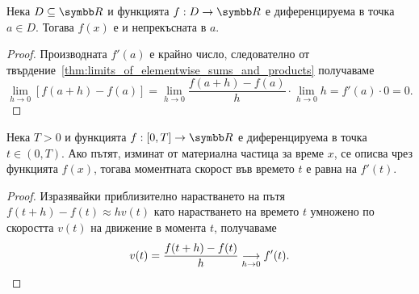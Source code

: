 \documentclass[numbers=endperiod, bibliography=totocnumbered]{scrartcl}
\begin{document}
\begin{proposition}
  Нека \( D \subseteq \R \) и функцията \( f: D \to \R \) е диференцируема в точка \( a \in D \). Тогава \( f(x) \) е и непрекъсната в \( a \).
\end{proposition}
\begin{proof}
  Производната \( f'(a) \) е крайно число, следователно от твърдение~\ref{thm:limits_of_elementwise_sums_and_products} получаваме
  \begin{equation*}
    \lim_{h \to 0} [f(a+h) - f(a)]
    =
    \lim_{h \to 0} \frac {f(a+h) - f(a)} h \cdot \lim_{h \to 0} h
    =
    f'(a) \cdot 0
    =
    0.
  \end{equation*}
\end{proof}

\begin{theorem}
  Нека \( T > 0 \) и функцията \( f: [0, T] \to \R \) е диференцируема в точка \( t \in (0, T) \). Ако пътят, изминат от материална частица за време \( x \), се описва чрез функцията \( f(x) \), тогава моментната скорост във времето \( t \) е равна на \( f'(t) \).
\end{theorem}
\begin{proof}
  Изразявайки приблизително нарастването на пътя \( f(t+h) - f(t) \approx h v(t) \) като нарастването на времето \( t \) умножено по скоростта \( v(t) \) на движение в момента \( t \), получаваме
  \begin{equation*}
    v(t) = \frac{f(t+h) - f(t)} {h} \Conv[h \to 0]{} f'(t).
  \end{equation*}
\end{proof}
\end{document}
